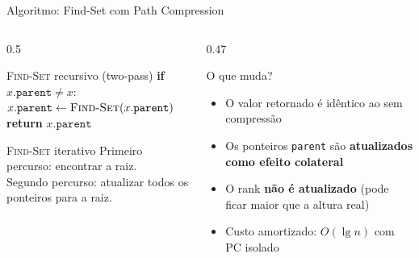 \documentclass[aspectratio=169]{beamer}
\begin{document}
\begin{frame}{Algoritmo: Find-Set com Path Compression}%
  \begin{columns}[T]
    \begin{column}{0.5\textwidth}
      \begin{block}{\textsc{Find-Set} recursivo (two-pass)}
        \textbf{if} $x.\texttt{parent} \neq x$:\\
        \quad $x.\texttt{parent} \leftarrow \textsc{Find-Set}(x.\texttt{parent})$\\
        \textbf{return} $x.\texttt{parent}$
      \end{block}
      \vspace{0.3cm}
      \begin{block}{\textsc{Find-Set} iterativo}
        Primeiro percurso: encontrar a raiz.\\
        Segundo percurso: atualizar todos os ponteiros para a raiz.
      \end{block}
    \end{column}
    \begin{column}{0.47\textwidth}
      \begin{exampleblock}{O que muda?}
        \begin{itemize}
          \item O valor retornado é idêntico ao sem compressão
          \item Os ponteiros \texttt{parent} são \textbf{atualizados como efeito colateral}
          \item O rank \textbf{não é atualizado} (pode ficar maior que a altura real)
          \item Custo amortizado: $O(\lg n)$ com PC isolado
        \end{itemize}
      \end{exampleblock}
    \end{column}
  \end{columns}
\end{frame}
\end{document}
